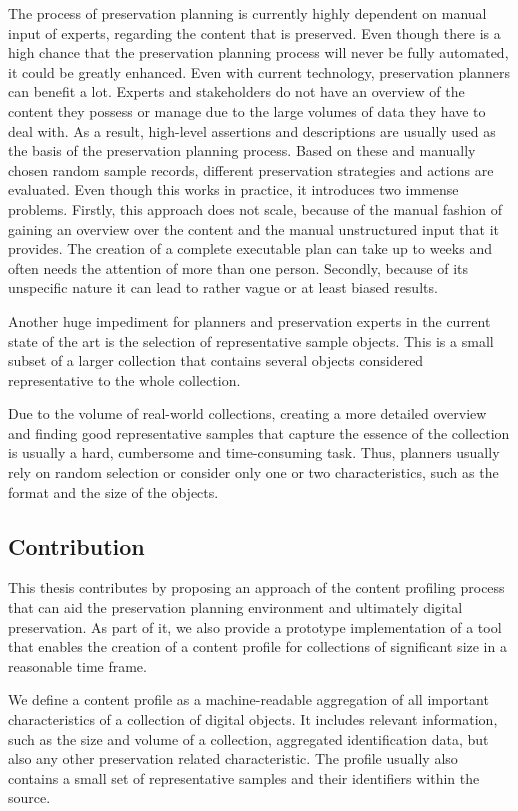 The process of preservation planning is currently highly dependent on manual input of experts, regarding the content that is preserved.
Even though there is a high chance that the preservation planning process will never be fully automated, it could be greatly enhanced. Even with current technology, preservation planners can benefit a lot.
Experts and stakeholders do not have an overview of the content they possess or manage due to the large volumes of data they have to deal with.
As a result, high-level assertions and descriptions are usually used as the basis of the preservation planning process.
Based on these and manually chosen random sample records, different preservation strategies and actions are evaluated.
Even though this works in practice, it introduces two immense problems.
Firstly, this approach does not scale, because of the manual fashion of gaining an overview over the content and the manual unstructured input that it provides.
The creation of a complete executable plan can take up to weeks and often needs the attention of more than one person.
Secondly, because of its unspecific nature it can lead to rather vague or at least biased results.

Another huge impediment for planners and preservation experts in the current state of the art is the selection of representative sample objects. This is a small subset of a larger collection that contains several objects considered representative to the whole collection. 

Due to the volume of real-world collections, creating a more detailed overview and finding good representative samples that capture the essence of the collection is usually a hard, cumbersome and time-consuming task.
Thus, planners usually rely on random selection or consider only one or two characteristics, such as the format and the size of the objects.


\subsection{Contribution}
This thesis contributes by proposing an approach of the content profiling process that can aid the preservation planning environment and ultimately digital preservation. As part of it, we also provide a prototype implementation of a tool that enables the creation of a content profile for collections of significant size in a reasonable time frame.

We define a content profile as a machine-readable aggregation of all important characteristics of a collection of digital objects. It includes relevant information, such as the size and volume of a collection, aggregated identification data, but also any other preservation related characteristic. The profile usually also contains a small set of representative samples and their identifiers within the source.


